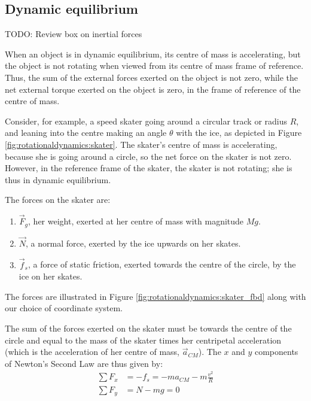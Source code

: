 \subsection{Dynamic equilibrium}
TODO: Review box on inertial forces

When an object is in dynamic equilibrium, its centre of mass is accelerating, but the object is not rotating when viewed from its centre of mass frame of reference. Thus, the sum of the external forces exerted on the object is not zero, while the net external torque exerted on the object is zero, in the frame of reference of the centre of mass.


Consider, for example, a speed skater going around a circular track or radius $R$, and leaning into the centre making an angle $\theta$ with the ice, as depicted in Figure \ref{fig:rotationaldynamics:skater}. The skater's centre of mass is accelerating, because she is going around a circle, so the net force on the skater is not zero. However, in the reference frame of the skater, the skater is not rotating; she is thus in dynamic equilibrium.

The forces on the skater are:
\begin{enumerate}
\item $\vec F_g$, her weight, exerted at her centre of mass with magnitude $Mg$.
\item $\vec N$, a normal force, exerted by the ice upwards on her skates.
\item $\vec f_s$, a force of static friction, exerted towards the centre of the circle, by the ice on her skates.
\end{enumerate}
The forces are illustrated in Figure \ref{fig:rotationaldynamics:skater_fbd} along with our choice of coordinate system.

The sum of the forces exerted on the skater must be towards the centre of the circle and equal to the mass of the skater times her centripetal acceleration (which is the acceleration of her centre of mass, $\vec a_{CM}$). The $x$ and $y$ components of Newton's Second Law are thus given by:
\begin{align*}
\sum F_x &= -f_s = -ma_{CM}- m\frac{v^2}{R}\\
\sum F_y &= N-mg = 0
\end{align*}

